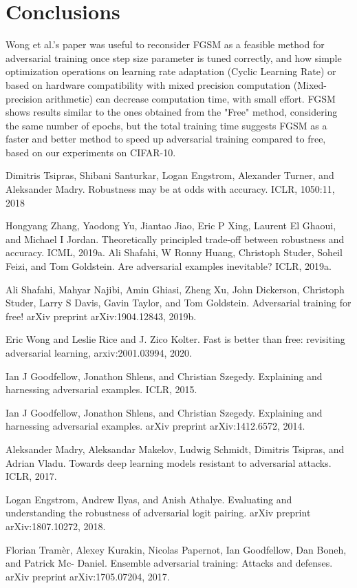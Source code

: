 \documentclass{article}
\begin{document}
\newpage
\section{Conclusions}
Wong et al.'s paper \cite{WongEtAl2020} was useful to reconsider FGSM as a
feasible method for adversarial training once step size parameter is tuned
correctly, and how simple optimization operations on learning rate adaptation
(Cyclic Learning Rate) or based on hardware compatibility with mixed precision
computation (Mixed-precision arithmetic) can decrease computation time, with
small effort. FGSM shows results similar to the ones obtained from the "Free"
method, considering the same number of epochs, but the total training time
suggests FGSM as a faster and better method to speed up adversarial training
compared to free, based on our experiments on CIFAR-10.   



\begin{thebibliography}{100} 
	 {Dimitris Tsipras, Shibani Santurkar, Logan Engstrom, Alexander Turner, and Aleksander Madry. Robustness may be at odds with accuracy. ICLR, 1050:11, 2018}

	 {Hongyang Zhang, Yaodong Yu, Jiantao Jiao, Eric P Xing, Laurent El Ghaoui, and Michael I Jordan. Theoretically principled trade-off between robustness and accuracy. ICML, 2019a.}
	 {Ali Shafahi, W Ronny Huang, Christoph Studer, Soheil Feizi, and Tom Goldstein. Are adversarial examples inevitable? ICLR, 2019a.}
	
	 {Ali Shafahi, Mahyar Najibi, Amin Ghiasi, Zheng Xu,
		John Dickerson, Christoph Studer, Larry S Davis, Gavin Taylor, and Tom
		Goldstein. Adversarial training for free! arXiv preprint arXiv:1904.12843,
		2019b.}
	
	 {Eric Wong and Leslie Rice and J. Zico Kolter. Fast is better than free: revisiting adversarial learning, arxiv:2001.03994, 2020.}
	
	 {Ian J Goodfellow, Jonathon Shlens, and Christian Szegedy. Explaining and harnessing adversarial examples. ICLR, 2015.}
	
	 {Ian J Goodfellow, Jonathon Shlens, and Christian Szegedy. Explaining and harnessing adversarial examples. arXiv preprint arXiv:1412.6572, 2014.}
	
	 {Aleksander Madry, Aleksandar Makelov, Ludwig Schmidt, Dimitris Tsipras, and Adrian Vladu. Towards deep learning models resistant to adversarial attacks. ICLR, 2017.}
	
	 {Logan Engstrom, Andrew Ilyas, and Anish Athalye. Evaluating and understanding the robustness of adversarial logit pairing. arXiv preprint arXiv:1807.10272, 2018.}
	
	 {Florian Tramèr, Alexey Kurakin, Nicolas Papernot,
		Ian Goodfellow, Dan Boneh, and Patrick Mc- Daniel. Ensemble adversarial
		training: Attacks and defenses. arXiv preprint arXiv:1705.07204, 2017.}
	
\end{thebibliography}
	
\end{document}
